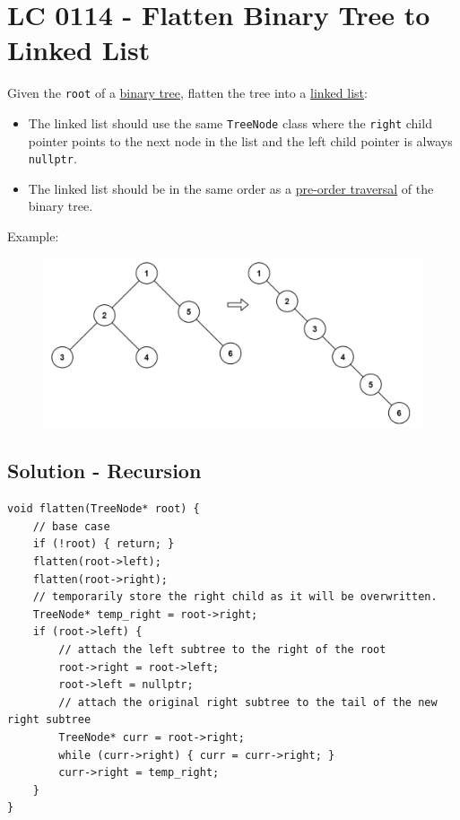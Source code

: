 \section{LC 0114 - Flatten Binary Tree to Linked List}
Given the {\colorbox{CodeBackground}{\lstinline|root|}} of a \ul{binary tree}, flatten the tree into a \ul{linked list}:
\begin{itemize}
	\item The linked list should use the same {\colorbox{CodeBackground}{\lstinline|TreeNode|}} class where the {\colorbox{CodeBackground}{\lstinline|right|}} child pointer points to the next node in the list and the left child pointer is always {\colorbox{CodeBackground}{\lstinline|nullptr|}}.
	\item The linked list should be in the same order as a \ul{pre-order traversal} of the binary tree.
\end{itemize}

Example:

\begin{figure}[H]
	\centering
	\includegraphics[width=0.8\linewidth]{images/lc0114_example}
	\label{fig:lc0114example}
\end{figure}

\subsection*{Solution - Recursion}
\begin{lstlisting}
void flatten(TreeNode* root) {
	// base case
	if (!root) { return; }
	flatten(root->left);
	flatten(root->right);
	// temporarily store the right child as it will be overwritten.
	TreeNode* temp_right = root->right;
	if (root->left) {
		// attach the left subtree to the right of the root
		root->right = root->left;
		root->left = nullptr;
		// attach the original right subtree to the tail of the new right subtree
		TreeNode* curr = root->right;
		while (curr->right) { curr = curr->right; }
		curr->right = temp_right;
	}
}
\end{lstlisting}

